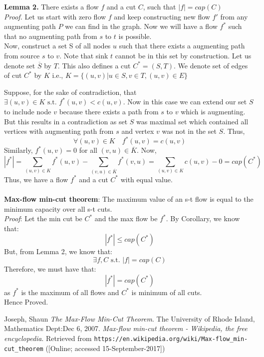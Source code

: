 \documentclass{article}
\begin{document}
    \textbf{Lemma 2.} There exists a flow $f$ and a cut $C$, such that $|f| = cap(C)$\\
    \textit{Proof.} Let us start with zero flow $f$ and keep constructing new flow $f'$ from any augmenting path $P$ we can
    find in the graph. Now we will have a flow $f^{*}$ such that no augmenting path from $s$ to $t$ is possible.\\
    Now, construct a set S of all nodes $u$ such that there exists a augmenting path from source $s$ to $v$. Note that sink $t$
    cannot be in this set by construction. Let us denote set $\overline{S}$ by $T$. This also defines a cut $C^* = (S,T)$. We
    denote set of edges of cut $C^*$ by $K$ i.e., $K = \{(u,v)| u\in S,v\in T, (u,v) \in E\}$

    Suppose, for the sake of contradiction, that $\exists (u,v)\in K \text{ s.t. }f^*(u,v) < c(u,v)$. Now in this case we can
    extend our set $S$ to include node $v$ because there exists a path from $s$ to $v$ which is augmenting. But this results in
    a contradiction as set $S$ was maximal set which contained all vertices with augmenting path from $s$ and vertex $v$ was not
    in the set $S$. Thus,
    $$ \forall (u,v) \in K \quad f^*(u,v) = c(u,v) $$
    Similarly, $f^*(u,v) = 0$ for all $(v,u) \in \overline{K}$. Now,
    $$
    |f^*| = \sum_{(u,v)\in K}f^*(u,v) - \sum_{(v,u)\in \overline{K}}f^*(v,u) = \sum_{(u,v)\in K}c(u,v) - 0 = cap(C^*)
    $$
    Thus, we have a flow $f^*$ and a cut $C^*$ with equal value.
    \\\\
    \textbf{Max-flow min-cut theorem}: The maximum value of an s-t flow is equal to the minimum capacity over all s-t cuts.\\
    \textit{Proof}: Let the min cut be $C^*$ and the max flow be $f^*$. By Corollary, we know that:
    $$|f^*| \leq cap(C^*)$$
    But, from Lemma 2, we know that:
    $$\exists f,C \text{ s.t. } |f| = cap(C)$$
    Therefore, we must have that:
    $$|f^*| = cap(C^*)$$
    as $f^*$ is the maximum of all flows and $C^*$ is minimum of all cuts.\\
    Hence Proved.

\begin{thebibliography}{9}
    Joseph, Shaun
  \textit{The Max-Flow Min-Cut Theorem}.
  The University of Rhode Island, Mathematics Dept:Dec 6, 2007.
      \textit{Max-flow min-cut theorem - Wikipedia, the free encyclopedia}. Retrieved from \texttt{https://en.wikipedia.org/wiki/Max-flow\_min-cut\_theorem} ([Online; accessed 15-September-2017])

\end{thebibliography}
\end{document}
